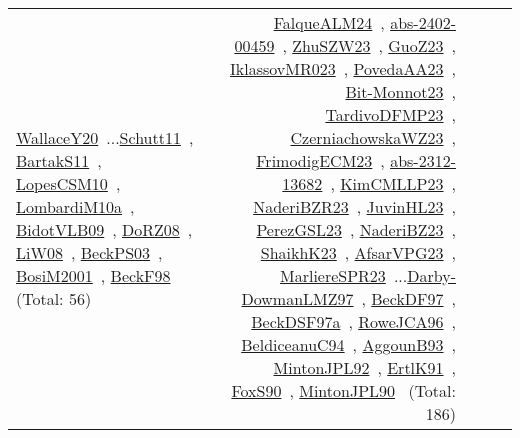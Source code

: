 {\begin{longtable}{p{3cm}r>{\raggedright\arraybackslash}p{6cm}>{\raggedright\arraybackslash}p{6cm}>{\raggedright\arraybackslash}p{8cm}}
\href{../works/WallaceY20.pdf}{WallaceY20}~\cite{WallaceY20}...\href{../works/Schutt11.pdf}{Schutt11}~\cite{Schutt11}, \href{../works/BartakS11.pdf}{BartakS11}~\cite{BartakS11}, \href{../works/LopesCSM10.pdf}{LopesCSM10}~\cite{LopesCSM10}, \href{../works/LombardiM10a.pdf}{LombardiM10a}~\cite{LombardiM10a}, \href{../works/BidotVLB09.pdf}{BidotVLB09}~\cite{BidotVLB09}, \href{../works/DoRZ08.pdf}{DoRZ08}~\cite{DoRZ08}, \href{../works/LiW08.pdf}{LiW08}~\cite{LiW08}, \href{../works/BeckPS03.pdf}{BeckPS03}~\cite{BeckPS03}, \href{../works/BosiM2001.pdf}{BosiM2001}~\cite{BosiM2001}, \href{../works/BeckF98.pdf}{BeckF98}~\cite{BeckF98} (Total: 56) & \href{../works/FalqueALM24.pdf}{FalqueALM24}~\cite{FalqueALM24}, \href{../works/abs-2402-00459.pdf}{abs-2402-00459}~\cite{abs-2402-00459}, \href{../works/ZhuSZW23.pdf}{ZhuSZW23}~\cite{ZhuSZW23}, \href{../works/GuoZ23.pdf}{GuoZ23}~\cite{GuoZ23}, \href{../works/IklassovMR023.pdf}{IklassovMR023}~\cite{IklassovMR023}, \href{../works/PovedaAA23.pdf}{PovedaAA23}~\cite{PovedaAA23}, \href{../works/Bit-Monnot23.pdf}{Bit-Monnot23}~\cite{Bit-Monnot23}, \href{../works/TardivoDFMP23.pdf}{TardivoDFMP23}~\cite{TardivoDFMP23}, \href{../works/CzerniachowskaWZ23.pdf}{CzerniachowskaWZ23}~\cite{CzerniachowskaWZ23}, \href{../works/FrimodigECM23.pdf}{FrimodigECM23}~\cite{FrimodigECM23}, \href{../works/abs-2312-13682.pdf}{abs-2312-13682}~\cite{abs-2312-13682}, \href{../works/KimCMLLP23.pdf}{KimCMLLP23}~\cite{KimCMLLP23}, \href{../works/NaderiBZR23.pdf}{NaderiBZR23}~\cite{NaderiBZR23}, \href{../works/JuvinHL23.pdf}{JuvinHL23}~\cite{JuvinHL23}, \href{../works/PerezGSL23.pdf}{PerezGSL23}~\cite{PerezGSL23}, \href{../works/NaderiBZ23.pdf}{NaderiBZ23}~\cite{NaderiBZ23}, \href{../works/ShaikhK23.pdf}{ShaikhK23}~\cite{ShaikhK23}, \href{../works/AfsarVPG23.pdf}{AfsarVPG23}~\cite{AfsarVPG23}, \href{../works/MarliereSPR23.pdf}{MarliereSPR23}~\cite{MarliereSPR23}...\href{../works/Darby-DowmanLMZ97.pdf}{Darby-DowmanLMZ97}~\cite{Darby-DowmanLMZ97}, \href{../works/BeckDF97.pdf}{BeckDF97}~\cite{BeckDF97}, \href{../works/BeckDSF97a.pdf}{BeckDSF97a}~\cite{BeckDSF97a}, \href{../works/RoweJCA96.pdf}{RoweJCA96}~\cite{RoweJCA96}, \href{../works/BeldiceanuC94.pdf}{BeldiceanuC94}~\cite{BeldiceanuC94}, \href{../works/AggounB93.pdf}{AggounB93}~\cite{AggounB93}, \href{../works/MintonJPL92.pdf}{MintonJPL92}~\cite{MintonJPL92}, \href{../works/ErtlK91.pdf}{ErtlK91}~\cite{ErtlK91}, \href{../works/FoxS90.pdf}{FoxS90}~\cite{FoxS90}, \href{../works/MintonJPL90.pdf}{MintonJPL90}~\cite{MintonJPL90} (Total: 186)\\

\end{longtable}}
